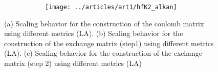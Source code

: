 \begin{figure}[htp]
\begin{subfigure}{\textwidth}
\begin{subfigure}{0.45\textwidth}
\centering
\texttt{[image: ../articles/art1/hfK2\_alkan]}
\end{subfigure}
\hfill
\begin{subtable}{0.45\textwidth}
\centering
{}
\end{subtable}
\caption{}
\label{fig:GS_DFK2SCALE_LA}
\end{subfigure}
\caption{(a) Scaling behavior for the construction of the coulomb matrix using different metrics (LA). (b) Scaling behavior for the construction of the exchange matrix (step1) using different metrics (LA). (c) Scaling behavior for the construction of the exchange matrix (step 2) using different metrics (LA)}
\end{figure}


